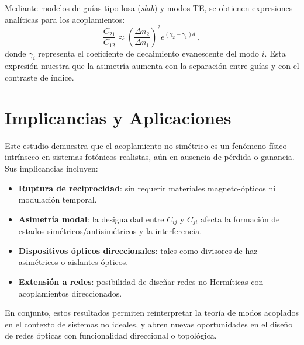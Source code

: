 Mediante modelos de guías tipo losa (\textit{slab}) y modos TE, se obtienen expresiones analíticas para los acoplamientos:
\begin{equation}
	\frac{C_{21}}{C_{12}} \approx \left( \frac{\Delta n_2}{\Delta n_1} \right)^2 e^{(\gamma_2 - \gamma_1) d} \ ,
\end{equation}
donde \( \gamma_i \) representa el coeficiente de decaimiento evanescente del modo \( i \). Esta expresión muestra que la asimetría aumenta con la separación entre guías y con el contraste de índice. 

\section{Implicancias y Aplicaciones}

Este estudio demuestra que el acoplamiento no simétrico es un fenómeno físico intrínseco en sistemas fotónicos realistas, aún en ausencia de pérdida o ganancia. Sus implicancias incluyen:

\begin{itemize}
	\item \textbf{Ruptura de reciprocidad}: sin requerir materiales magneto-ópticos ni modulación temporal.
	\item \textbf{Asimetría modal}: la desigualdad entre \( C_{ij} \) y \( C_{ji} \) afecta la formación de estados simétricos/antisimétricos y la interferencia.
	\item \textbf{Dispositivos ópticos direccionales}: tales como divisores de haz asimétricos o aislantes ópticos.
	\item \textbf{Extensión a redes}: posibilidad de diseñar redes no Hermíticas con acoplamientos direccionados.
\end{itemize}

En conjunto, estos resultados permiten reinterpretar la teoría de modos acoplados en el contexto de sistemas no ideales, y abren nuevas oportunidades en el diseño de redes ópticas con funcionalidad direccional o topológica.


